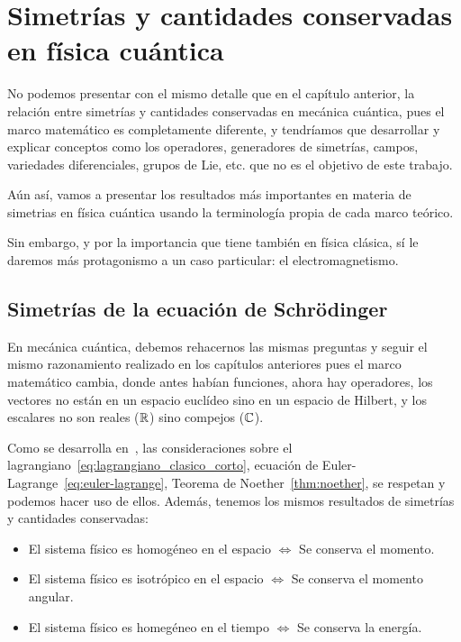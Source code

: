 
\chapter{Simetrías y cantidades conservadas en física cuántica}\label{ch:simetrias-y-cantidades-conservadas-en-fisica-cuantica}

No podemos presentar con el mismo detalle que en el capítulo anterior, la relación entre simetrías y cantidades conservadas en mecánica cuántica, pues el marco matemático es completamente diferente, y tendríamos que desarrollar y explicar conceptos como los operadores, generadores de simetrías, campos, variedades diferenciales, grupos de Lie, etc. que no es el objetivo de este trabajo.

Aún así, vamos a presentar los resultados más importantes en materia de simetrias en física cuántica usando la terminología propia de cada marco teórico.

Sin embargo, y por la importancia que tiene también en física clásica, sí le daremos más protagonismo a un caso particular: el electromagnetismo.

\section{Simetrías de la ecuación de Schrödinger}\label{sec:simetrias-de-la-ecuacion-de-schrodinger}

En mecánica cuántica, debemos rehacernos las mismas preguntas y seguir el mismo razonamiento realizado en los capítulos anteriores pues el marco matemático cambia, donde antes habían funciones, ahora hay operadores, los vectores no están en un espacio euclídeo sino en un espacio de Hilbert, y los escalares no son reales ($\mathbb{R}$) sino compejos ($\mathbb{C}$).

Como se desarrolla en~\cite{QMS}, las consideraciones sobre el lagrangiano~\eqref{eq:lagrangiano_clasico_corto}, ecuación de Euler-Lagrange~\eqref{eq:euler-lagrange}, Teorema de Noether~\eqref{thm:noether}, se respetan y podemos hacer uso de ellos.
Además, tenemos los mismos resultados de simetrías y cantidades conservadas:

\begin{itemize}
	\item El sistema físico es homogéneo en el espacio $\Leftrightarrow$ Se conserva el momento.
	\item El sistema físico es isotrópico en el espacio $\Leftrightarrow$ Se conserva el momento angular.
	\item El sistema físico es homegéneo en el tiempo $\Leftrightarrow$ Se conserva la energía.
\end{itemize}

